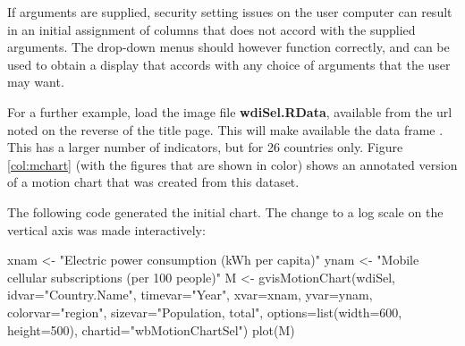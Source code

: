 If arguments are supplied, security setting issues on the user
computer can result in an initial assignment of columns that does not
accord with the supplied arguments.  The drop-down menus should however function
correctly, and can be used to obtain a display that accords with any
choice of arguments that the user may want.

For a further example, load the image file {\bf wdiSel.RData},
available from the url noted on the reverse of the title page. This
will make available the data frame . This has a larger
number of indicators, but for 26 countries only.  Figure
\ref{col:mchart} (with the figures that are shown in color) shows an
annotated version of a motion chart that was created from this
dataset.

The following code generated the initial chart.  The change
to a log scale on the vertical axis was made interactively:
\begin{fullwidth}
\begin{Schunk}
\begin{Sinput}
xnam <- "Electric power consumption (kWh per capita)"
ynam <- "Mobile cellular subscriptions (per 100 people)"
M <- gvisMotionChart(wdiSel, idvar="Country.Name", timevar="Year",
                     xvar=xnam, yvar=ynam,
                     colorvar="region", sizevar="Population, total",
                     options=list(width=600, height=500),
                     chartid="wbMotionChartSel")
plot(M)
\end{Sinput}
\end{Schunk}
\end{fullwidth}
